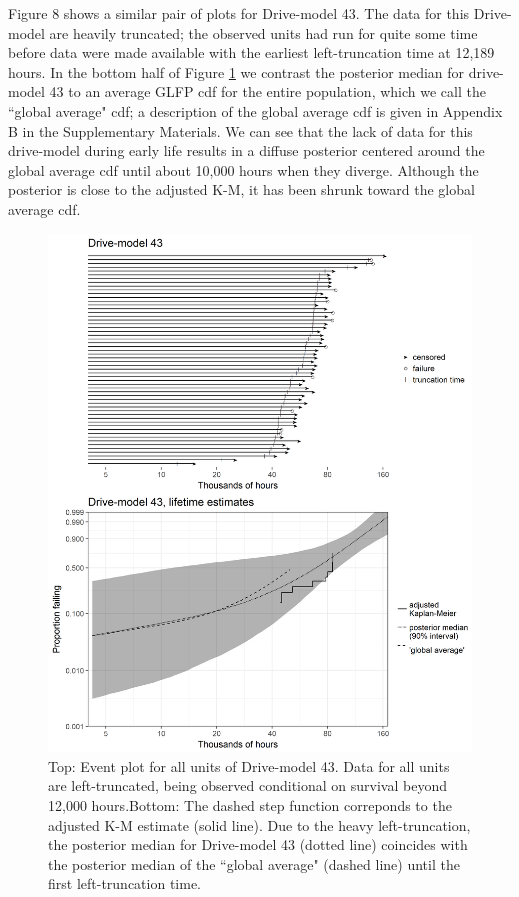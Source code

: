 \documentclass[11pt]{article}
\begin{document}
Figure 8 shows a similar pair of plots for Drive-model 43. The data for this Drive-model are heavily truncated; the observed units had run for quite some time before data were made available with the earliest left-truncation time at 12,189 hours. In the bottom half of Figure \ref{fig:ex-mod-43} we contrast the posterior median for drive-model 43 to an average GLFP cdf for the entire population, which we call the ``global average" cdf; a description of the global average cdf is given in Appendix B in the Supplementary Materials. We can see that the lack of data for this drive-model during early life results in a diffuse posterior centered around the global average cdf until about 10,000 hours when they diverge. Although the posterior is close to the adjusted K-M, it has been shrunk toward the global average cdf.


\begin{figure}
\centering
\includegraphics[height=.8\textheight]{dm43-shrinkage.png}
\caption{\footnotesize Top: Event plot for all units of Drive-model 43. Data for all units are left-truncated, being observed conditional on survival beyond 12,000 hours.\hspace{\textwidth}Bottom: The dashed step function correponds to the adjusted K-M estimate (solid line). Due to the heavy left-truncation, the posterior median for Drive-model 43 (dotted line) coincides with the posterior median of the ``global average" (dashed line) until the first left-truncation time.}
\label{fig:ex-mod-43}
\end{figure}
\end{document}

